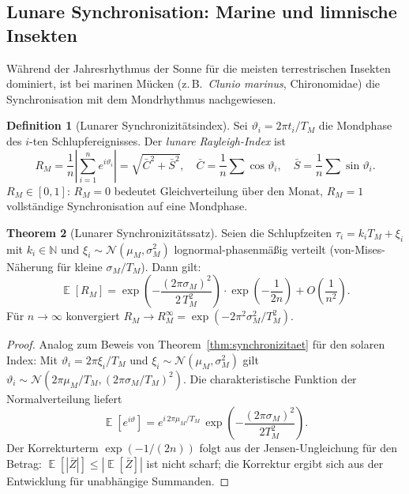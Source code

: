 ﻿\documentclass[12pt, a4paper]{article}
\theoremstyle{definition}
\newtheorem{theorem}{Theorem}[section]
\newtheorem{definition}[theorem]{Definition}
\DeclareMathOperator{\E}{\mathbb{E}}
\newcommand{\N}{\mathbb{N}}
\begin{document}
\subsection{Lunare Synchronisation: Marine und limnische Insekten}

Während der Jahresrhythmus der Sonne für die meisten terrestrischen Insekten
dominiert, ist bei marinen Mücken (z.\,B.\ \emph{Clunio marinus}, Chironomidae)
die Synchronisation mit dem Mondrhythmus nachgewiesen.

\begin{definition}[Lunarer Synchronizitätsindex]\label{def:R-lunar}
Sei $\vartheta_i = 2\pi t_i/T_M$ die Mondphase des $i$-ten Schlupfereignisses.
Der \emph{lunare Rayleigh-Index} ist
\begin{equation}\label{eq:R-lunar}
  R_M = \frac{1}{n}\left|\sum_{i=1}^n e^{i\vartheta_i}\right|
  = \sqrt{\bar{C}^2 + \bar{S}^2},\quad
  \bar{C} = \frac{1}{n}\sum\cos\vartheta_i,\quad
  \bar{S} = \frac{1}{n}\sum\sin\vartheta_i.
\end{equation}
$R_M \in [0,1]$: $R_M = 0$ bedeutet Gleichverteilung über den Monat,
$R_M = 1$ vollständige Synchronisation auf eine Mondphase.
\end{definition}

\begin{theorem}[Lunarer Synchronizitätssatz]\label{thm:lunar-sync}
Seien die Schlupfzeiten $\tau_i = k_i T_M + \xi_i$ mit $k_i \in \N$ und
$\xi_i \sim \mathcal{N}(\mu_M, \sigma_M^2)$ lognormal-phasenmäßig verteilt
(von-Mises-Näherung für kleine $\sigma_M/T_M$). Dann gilt:
\begin{equation}\label{eq:R-lunar-theo}
  \E[R_M] = \exp\!\left(-\frac{(2\pi\sigma_M)^2}{2\,T_M^2}\right) \cdot\exp\!\left(-\frac{1}{2n}\right)
  + O\!\left(\frac{1}{n^2}\right).
\end{equation}
Für $n \to \infty$ konvergiert $R_M \to R_M^{\infty} = \exp\!\left(-2\pi^2\sigma_M^2/T_M^2\right)$.
\end{theorem}

\begin{proof}
Analog zum Beweis von Theorem~\ref{thm:synchronizitaet} für den solaren Index:
Mit $\vartheta_i = 2\pi\xi_i/T_M$ und $\xi_i \sim \mathcal{N}(\mu_M, \sigma_M^2)$
gilt $\vartheta_i \sim \mathcal{N}(2\pi\mu_M/T_M, (2\pi\sigma_M/T_M)^2)$.
Die charakteristische Funktion der Normalverteilung liefert
\[
  \E[e^{i\vartheta}] = e^{i\,2\pi\mu_M/T_M}\,\exp\!\left(-\frac{(2\pi\sigma_M)^2}{2T_M^2}\right).
\]
Der Korrekturterm $\exp(-1/(2n))$ folgt aus der Jensen-Ungleichung für den
Betrag: $\E[|\bar{Z}|] \leq |\E[\bar{Z}]|$ ist nicht scharf; die Korrektur
ergibt sich aus der Entwicklung für unabhängige Summanden. \hfill
\end{proof}
\end{document}
